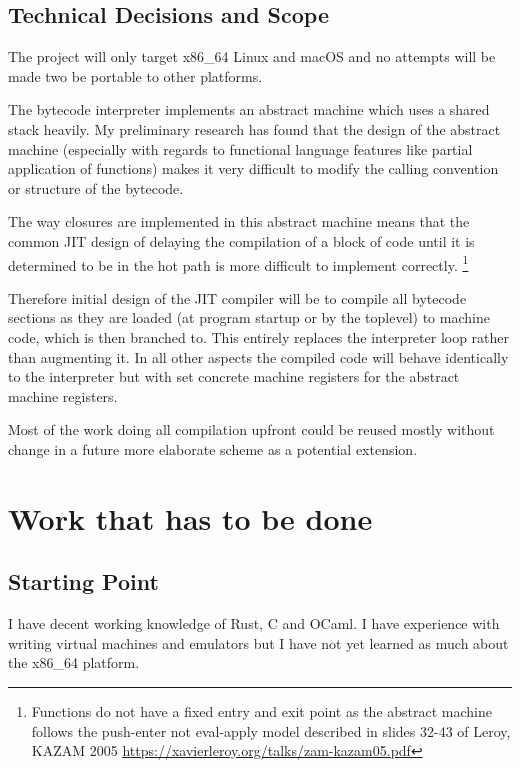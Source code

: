 \documentclass[12pt,a4paper, headings=standardclasses]{scrartcl}
\begin{document}
\subsection*{Technical Decisions and Scope}

The project will only target x86\_64 Linux and macOS and no attempts will be made
two be portable to other platforms.

The bytecode interpreter implements an abstract machine which uses a shared
stack heavily. My preliminary research has found that the design of the
abstract machine (especially with regards to functional language features
like partial application of functions) makes it very difficult to modify the
calling convention or structure of the bytecode.

The way closures are implemented in this abstract machine means that the common JIT
design of delaying the compilation of a block of code until it is determined
to be in the hot path is more difficult to implement correctly.
\footnote{Functions do not have a fixed entry and exit point as the abstract
machine follows the push-enter not eval-apply model described in slides
32-43 of Leroy, KAZAM 2005
\href{https://xavierleroy.org/talks/zam-kazam05.pdf}{https://xavierleroy.org/talks/zam-kazam05.pdf}}

Therefore initial design of the JIT compiler will be to compile
all bytecode sections as they are loaded (at program startup or by the
toplevel) to machine code, which is then branched to. This entirely replaces the
interpreter loop rather than augmenting it. In all other aspects the compiled
code will behave identically to the interpreter but with set concrete machine
registers for the abstract machine registers.

Most of the work doing all compilation upfront could be reused mostly without change
in a future more elaborate scheme as a potential extension.

\section*{Work that has to be done}

\subsection*{Starting Point}

I have decent working knowledge of Rust, C and OCaml. I have experience with
writing virtual machines and emulators but I have not yet learned as much about
the x86\_64 platform.
\end{document}

